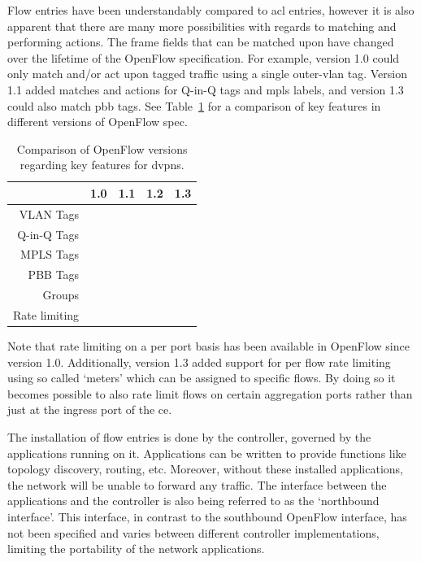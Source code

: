 Flow entries have been understandably compared to \acs{acl} entries, however it is also apparent that there are many more possibilities with regards to matching and performing actions. The frame fields that can be matched upon have changed over the lifetime of the OpenFlow specification. For example, version 1.0 could only match and/or act upon tagged traffic using a single outer-\acs{vlan} tag. Version 1.1 added matches and actions for Q-in-Q tags and \ac{mpls} labels, and version 1.3 could also match \ac{pbb} tags. See Table~\ref{tb:of-versions} for a comparison of key features in different versions of OpenFlow spec. 

\begin{table}[!h]
	\centering
	\begin{tabular}{r|cccc}
	 			& 1.0 & 1.1 & 1.2 & 1.3 \\
	\hline
	VLAN Tags 	& \checkmark & \checkmark & \checkmark & \checkmark \\
	Q-in-Q Tags &   & \checkmark & \checkmark & \checkmark \\
	MPLS Tags 	&   & \checkmark & \checkmark & \checkmark \\
	PBB Tags 	&   &   &   & \checkmark \\
	Groups 		&   & \checkmark & \checkmark & \checkmark \\
	Rate limiting & \checkmark & \checkmark & \checkmark & \checkmark  \\
	\end{tabular}
	\caption{Comparison of OpenFlow versions regarding key features for \acp{dvpn}.}
	\label{tb:of-versions}	
\end{table}

Note that rate limiting on a per port basis has been available in OpenFlow since version 1.0. Additionally, version 1.3 added support for per flow rate limiting using so called `meters' which can be assigned to specific flows. By doing so it becomes possible to also rate limit flows on certain aggregation ports rather than just at the ingress port of the \ac{ce}.

The installation of flow entries is done by the controller, governed by the applications running on it. Applications can be written to provide functions like topology discovery, routing, etc. Moreover, without these installed applications, the network will be unable to forward any traffic. The interface between the applications and the controller is also being referred to as the `northbound interface'. This interface, in contrast to the southbound OpenFlow interface, has not been specified and varies between different controller implementations, limiting the portability of the network applications.

